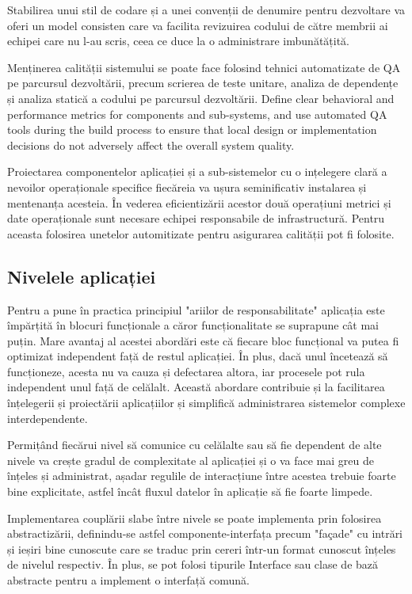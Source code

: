 \documentclass[12pt, a4paper, oneside, romanian]{teza-upb}
\begin{document}
Stabilirea unui stil de codare și a unei convenții de denumire pentru dezvoltare va oferi un model consisten care va facilita revizuirea codului de către membrii ai echipei care nu l-au scris, ceea ce duce la o administrare imbunătățită.

Menținerea calității sistemului se poate face folosind tehnici automatizate de QA pe parcursul dezvoltării, precum scrierea de teste unitare, analiza de dependențe și analiza statică a codului pe parcursul dezvoltării.
Define clear behavioral and performance metrics for components and sub-systems, and use automated QA tools during the build process to ensure that local design or implementation decisions do not adversely affect the overall system quality.

Proiectarea componentelor aplicației și a sub-sistemelor cu o ințelegere clară a nevoilor operaționale specifice fiecăreia va ușura seminificativ instalarea și mentenanța acesteia. În vederea eficientizării acestor două operațiuni metrici și date operaționale sunt necesare echipei responsabile de infrastructură. Pentru aceasta folosirea unetelor automitizate pentru asigurarea calității pot fi folosite.

\subsection{Nivelele aplicației}
Pentru a pune în practica principiul "ariilor de responsabilitate" aplicația este împărțită în blocuri funcționale a căror funcționalitate se suprapune cât mai puțin. Mare avantaj al acestei abordări este că fiecare bloc funcțional va putea fi optimizat independent față de restul aplicației. În plus, dacă unul încetează să funcționeze, acesta nu va cauza și defectarea altora, iar procesele pot rula independent unul față de celălalt. Această abordare contribuie și la facilitarea înțelegerii și proiectării aplicațiilor și simplifică administrarea sistemelor complexe interdependente.

Permițând fiecărui nivel să comunice cu celălalte sau să fie dependent de alte nivele va crește gradul de complexitate al aplicației și o va face mai greu de înțeles și administrat, așadar regulile de interacțiune între acestea trebuie foarte bine explicitate, astfel încât fluxul datelor în aplicație să fie foarte limpede.

Implementarea couplării slabe între nivele se poate implementa prin folosirea abstractizării, definindu-se astfel componente-interfața precum "façade" cu intrări și ieșiri bine cunoscute care se traduc prin cereri într-un format cunoscut înțeles de nivelul respectiv. În plus, se pot folosi tipurile Interface sau clase de bază abstracte pentru a implement o interfață comună.
\end{document}
